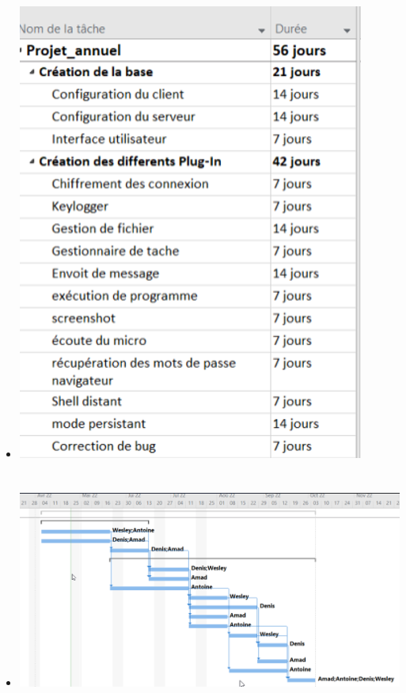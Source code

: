 \documentclass{beamer}
\begin{document}
\section{}
  \begin{frame}{}
  \begin{itemize}
	\item 
	\includegraphics[scale=.5]{gaant1.png}
  \end{itemize}
  \end{frame}

\section{}
  \begin{frame}{}
  \begin{itemize}
	\item 
	\includegraphics[scale=.4]{gaant2.png}
  \end{itemize}
  \end{frame}
\end{document}
